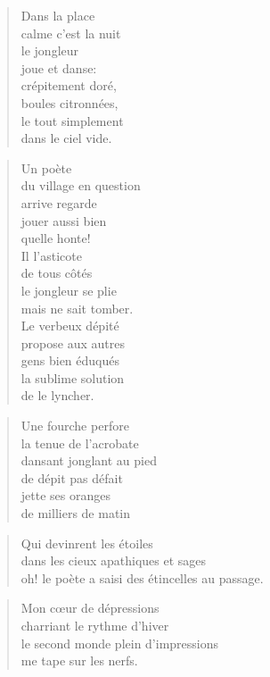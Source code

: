  \begin{verse}
    Dans la place\\
    calme c’est la nuit\\
    le jongleur\\
    joue et danse:\\
    crépitement doré,\\
    boules citronnées,\\
    le tout simplement\\
    dans le ciel vide.
  \end{verse}
  \begin{verse}
    Un poète\\
    du village en question\\
    arrive regarde\\
    jouer aussi bien\\
    quelle honte!\\
    Il l’asticote\\
    de tous côtés\\
    le jongleur se plie\\
    mais ne sait tomber.\\
    Le verbeux dépité\\
    propose aux autres\\
    gens bien éduqués\\
    la sublime solution\\
    de le lyncher.
  \end{verse}
  \begin{verse}
    Une fourche perfore\\
    la tenue de l’acrobate\\
    dansant jonglant au pied\\
    de dépit pas défait\\
    jette ses oranges\\
    de milliers de matin
  \end{verse}
  \begin{verse}
    Qui devinrent les étoiles\\
    dans les cieux apathiques et sages\\
    oh! le poète a saisi des étincelles au passage.
  \end{verse}
  \begin{verse}
    Mon cœur de dépressions\\
    charriant le rythme d’hiver\\
    le second monde plein d’impressions\\
    me tape sur les nerfs.
  \end{verse}

